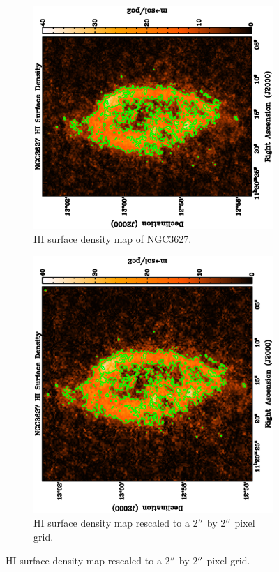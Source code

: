 \begin{figure}
  \centering
  \begin{subfigure}[t]{.48\textwidth}
    \centering
    \includegraphics[width=1.\linewidth, angle=270]{obs_imgs/HI_orig.eps}
    \caption{HI surface density map of NGC3627.}
  \end{subfigure}%
  \quad
  \begin{subfigure}[t]{.48\textwidth}
    \centering
    \includegraphics[width=1.\linewidth, angle=270]{obs_imgs/HI_align.eps}
    \caption{HI surface density map rescaled to a 2$\mbox{$^{\prime\prime}$}$ by 2$\mbox{$^{\prime\prime}$}$ pixel grid.}
  \end{subfigure}%


\end{figure}
